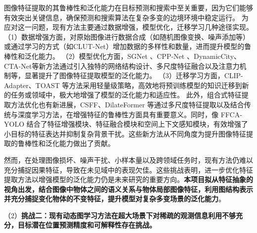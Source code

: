 图像特征提取的其鲁棒性和泛化能力在目标预测和搜索中至关重要，因为它们能够有效突出关键信息，确保预测和搜索算法在复杂多变的边境环境中稳定运行。
为应对这一问题，现有方法主要通过数据增强，模型优化，迁移学习几种途径实现。
（1）数据增强方面，对原始图像进行数据合成（如随机图像变换\cite{cubuk2020randaugment}、噪声添加\cite{chowdhury2025r}等）或通过学习的方式（如CLUT-Net\cite{mei2022clut}）增加数据的多样性和数量，进而提升模型的鲁棒性和泛化能力。
（2）模型优化方面，SGNet \cite{liu2021sg}、CPP-Net \cite{guo2024cpp} 、DynamicCity\cite{dynamiccity2025}、CTA-Net\cite{Meng2024CTA-Net}等新方法通过引入独特的网络结构设计、多尺度特征融合以及注意力机制等，显著提升了图像特征提取模型的泛化能力。
（3）迁移学习方面，CLIP-Adapter\cite{gao2021clip}、TOAST\cite{shi2023toast} 等方法采用轻量级策略，高效地将预训练模型的知识迁移到新的任务或领域中，极大地增强了模型的泛化能力和适应性。
此外，组合式特征提取方法优化也有新进展，CSFF\cite{cheng2020cross}、DilateFormer\cite{jiao2023dilateformer} 等通过多尺度特征提取以及结合传统与深度学习方法，在增强特征的鲁棒性方面具有重要意义。同时，像 FFCA-YOLO \cite{yin2024ffca} 结合了特征增强模块、特征融合模块和空间上下文感知模块，有效增强了小目标的特征表达并抑制复杂背景干扰。这些新方法从不同角度为提升图像特征提取的鲁棒性和泛化能力做出了贡献。

然而，在处理图像损坏、噪声干扰、小样本量以及跨领域任务时，现有方法仍难以充分捕捉因果特征，导致在未见域中的表现欠佳。这些挑战表明，进一步优化特征提取方法以增强模型的泛化能力仍是未来研究的重要方向。\textbf{本项目拟从特征抽象的视角出发，结合图像中物体之间的语义关系与物体局部图像特征，利用图结构表示并充分捕捉变化物体的不变特征，提升模型对复杂多变场景的泛化能力}。

（2）\textbf{挑战二：现有动态图学习方法在超大场景下对稀疏的观测信息利用不够充分，目标潜在位置预测精度和可解释性存在挑战。}


